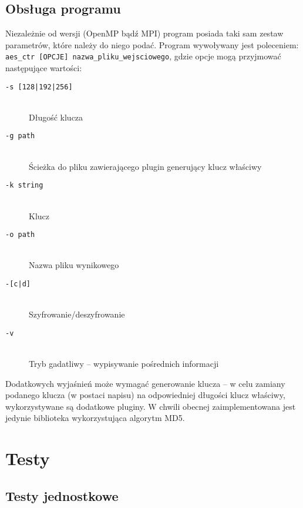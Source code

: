 \documentclass[a4paper,12pt]{article}
\begin{document}
\subsection{Obsługa programu}

Niezależnie od wersji (OpenMP bądź MPI) program posiada taki sam zestaw parametrów, 
które należy do niego podać. Program wywoływany jest poleceniem:\\
\texttt{aes\_ctr [OPCJE] nazwa\_pliku\_wejsciowego}, gdzie opcje mogą przyjmować
następujące wartości:

\begin{description}
\item[\texttt{-s [128|192|256]}] \hfill \\ 
Długość klucza
\item[\texttt{-g path}] \hfill \\ 
Ścieżka do pliku zawierającego plugin generujący klucz właściwy
\item[\texttt{-k string}] \hfill \\ 
Klucz
\item[\texttt{-o path}] \hfill \\ 
Nazwa pliku wynikowego
\item[\texttt{-[c|d]}] \hfill \\ 
Szyfrowanie/deszyfrowanie
\item[\texttt{-v}] \hfill \\ 
Tryb gadatliwy -- wypisywanie pośrednich informacji
\end{description}

Dodatkowych wyjaśnień może wymagać generowanie klucza -- w celu zamiany podanego
klucza (w postaci napisu) na odpowiedniej długości klucz właściwy, wykorzystywane
są dodatkowe pluginy. W chwili obecnej zaimplementowana jest jedynie biblioteka
wykorzystująca algorytm MD5.

\section{Testy}

\subsection{Testy jednostkowe}
\end{document}
